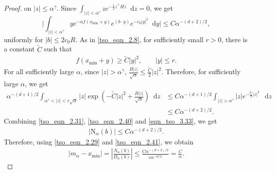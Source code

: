 \documentclass[10pt,a4paper]{amsart}
\newcommand*\der{\mathop{}\!\mathrm{d}}
\begin{document}
\begin{proof}
on \(|z|\le \alpha^\gamma\). 
Since  $\int_{|z| < \alpha^\gamma} z e^{-\frac{1}{2}z^{\top}H z} \der z = 0$,  we get
\begin{equation}\label{tso_eqn_2.40}
   \bigg| \int_{|z|<\alpha^\gamma}
    ye^{-\alpha f(x_{\min}+y)}
    e^{(b\cdot y)}
    e^{-c_0|y|^2}
    \der y\bigg| \leq
    C\alpha^{-(d+2)/2},
\end{equation}
uniformly for $|b|\leq 2c_0 R$.  As in \eqref{tso_eqn_2.8}, for sufficiently small $r >0$, there is a constant $\tilde{C}$ such that
\begin{align*}
    f(x_{\min} + y) \geq \tilde{C} |y|^2,\qquad |y|\leq r.
\end{align*}
For all sufficiently large $\alpha$, since $|z|>\alpha^\gamma$, $\frac{B|z|}{\sqrt\alpha}
    \leq \frac{\tilde C}{2}|z|^2$. Therefore, for sufficiently large $\alpha$, we get
\begin{align}\label{eqn_tso_3.33}
        \alpha^{-(d+1)/2}
    \int_{\alpha^\gamma<|z|<r\sqrt\alpha}
    |z|\exp\left(-\tilde{C} |z|^2
        +
        \frac{B|z|}{\sqrt\alpha}
    \right)\der z & \leq  
    C\alpha^{-(d+1)/2}
    \int_{|z|>\alpha^\gamma}
    |z|e^{-\frac{\tilde{C}}{2}|z|^2}\,\der z  \nonumber 
    \\   &  \leq  C\alpha^{-(d+2)/2}.
\end{align}
Combining \eqref{tso_eqn_2.31}, \eqref{tso_eqn_2.40} and \eqref{eqn_tso_3.33}, we get
\begin{align}\label{tso_eqn_2.41}
    |\mathrm{N}_\alpha(b)| \leq
    C\alpha^{-(d+2)/2}.
\end{align}
Therefore, using \eqref{tso_eqn_2.29} and \eqref{tso_eqn_2.41}, we obtain
\begin{align}
 |m_\alpha - x_{\min}| =    \left|\frac{N_\alpha(b)}{D_\alpha(b)}\right|
    \leq
    \frac{
        C\alpha^{-(d+2)/2} }{        c\alpha^{-d/2}} =
    \frac{C}{\alpha}.
\end{align}
\end{proof}
\end{document}

